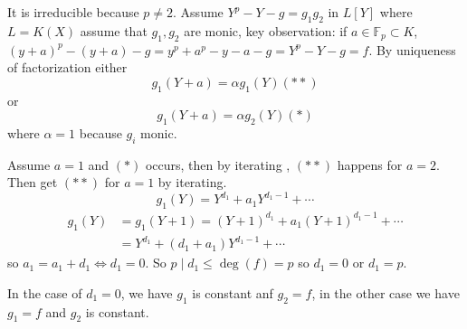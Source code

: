 \documentclass[11pt]{article}
\theoremstyle{definition}
\newcommand{\bbf}{\mathbb F}
\newcommand{\Llrta}{\Longleftrightarrow}
\begin{document}
It is irreducible because $p\neq 2$. Assume $Y^p-Y-g=g_1g_2$ in $L[Y]$ where $L=K(X)$ assume that $g_1,g_2$ are monic, key observation:
if $a\in \bbf_p\subset K$, $(y+a)^p-(y+a)-g=y^p+a^p-y-a-g=Y^p-Y-g=f$. By uniqueness of factorization either 
$$
g_1(Y+a)=\alpha g_1(Y)(**)
$$
or 
$$
g_1(Y+a)=\alpha g_2(Y)(*)
$$
where $\alpha=1$ because $g_i$ monic.


Assume $a=1$ and $(*)$ occurs, then by iterating , $(**)$ happens for $a=2$. Then get $(**)$ for $a=1$ by iterating.
$$
g_1(Y)=Y^{d_1}+a_1Y^{d_1-1}+\cdots
$$
$$
\begin{aligned}
g_1(Y)&=g_1(Y+1)=(Y+1)^{d_1}+a_1 (Y+1)^{d_1-1}+\cdots\\
&=Y^{d_1}+(d_1+a_1)Y^{d_1-1}+\cdots
\end{aligned}
$$
so $a_1=a_1+d_1\Llrta d_1=0$. So $p\mid d_1\leq \deg(f)=p$
so $d_1=0$ or $d_1=p$.

In the case of $d_1=0$, we have $g_1$ is constant anf $g_2=f$, in the other case we have $g_1=f$ and $g_2$ is constant.
\end{document}
